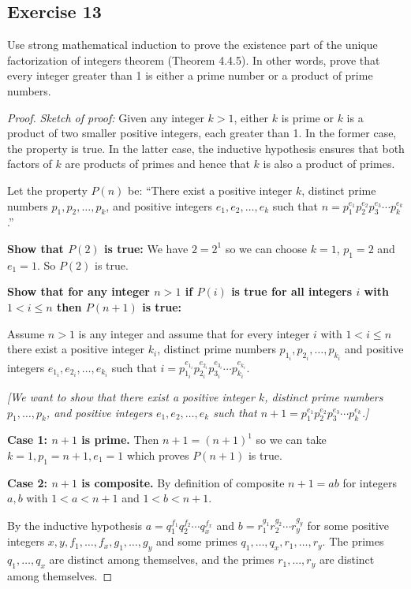 \documentclass[14pt]{extarticle}
\begin{document}
\subsection{Exercise 13}
Use strong mathematical induction to prove the existence part of the unique factorization of integers theorem (Theorem 4.4.5). In other words, prove that every integer greater than 1 is either a prime number or a product of prime numbers.

\begin{proof}
    {\it Sketch of proof:} Given any integer $k > 1$, either $k$ is prime or $k$ is a product of two smaller positive integers, each greater than 1.
    In the former case, the property is true.
    In the latter case, the inductive hypothesis ensures that both factors of $k$ are products of primes and hence that $k$ is also a product of primes.

    Let the property $P(n)$ be: ``There exist a positive integer $k$, distinct prime numbers $p_1, p_2, \ldots, p_k$, and positive integers $e_1, e_2, \ldots, e_k$ such that $n = p_1^{e_1} p_2^{e_2} p_3^{e_3} \cdots p_k^{e_k}$.''

    {\bf Show that $P(2)$ is true:} We have $2 = 2^{1}$ so we can choose $k = 1$, $p_1 = 2$ and $e_1 = 1$. So $P(2)$ is true.

        {\bf Show that for any integer $n > 1$ if $P(i)$ is true for all integers $i$ with $1 < i \leq n$ then $P(n+1)$ is true:}

    Assume $n > 1$ is any integer and assume that for every integer $i$ with $1 < i \leq n$ there exist a positive integer $k_i$, distinct prime numbers $p_{1_i}, p_{2_i}, \ldots, p_{k_i}$ and positive integers $e_{1_i}, e_{2_i}, \ldots, e_{k_i}$ such that $i = p_{1_i}^{e_{1_i}} p_{2_i}^{e_{2_i}} p_{3_i}^{e_{3_i}} \cdots p_{k_i}^{e_{k_i}}$.

    {\it [We want to show that there exist a positive integer $k$, distinct prime numbers $p_1, \ldots, p_k$, and positive integers $e_1, e_2, \ldots, e_k$ such that $n+1 = p_1^{e_1} p_2^{e_2} p_3^{e_3} \cdots p_k^{e_k}$.]}

    {\bf Case 1: $n+1$ is prime.} Then $n + 1 = (n+1)^1$ so we can take $k = 1, p_1 = n+1, e_1 = 1$ which proves $P(n+1)$ is true.

        {\bf Case 2: $n+1$ is composite.} By definition of composite $n+1 = ab$ for integers $a,b$ with $1 < a < n+1$ and $1 < b < n+1$.

    By the inductive hypothesis $a = q_1^{f_1} q_2^{f_2} \cdots q_x^{f_x}$ and $b = r_1^{g_1} r_2^{g_2} \cdots r_y^{g_y}$ for some positive integers $x, y, f_1, \ldots, f_x, g_1, \ldots, g_y$ and some primes $q_1, \ldots, q_x, r_1, \ldots, r_y$. The primes $q_1, \ldots, q_x$ are distinct among themselves, and the primes $r_1, \ldots, r_y$ are distinct among themselves.


\end{proof}
\end{document}

